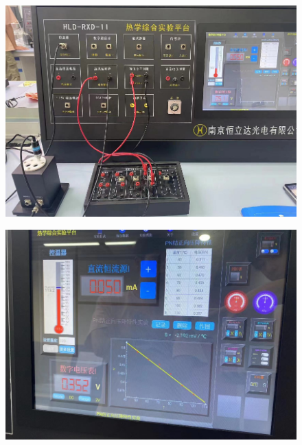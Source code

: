 \documentclass[UTF8]{article}
\begin{document}
    	\begin{figure}[H]
    	   \begin{minipage}[t]{0.5\linewidth}
    	      \centering
    	      \includegraphics[clip,scale=0.5,trim={0 0 0 0}]{fig/fig7.png}
    	      \label{figure.9}
    	   \end{minipage}
    	   \begin{minipage}[t]{0.5\linewidth}
    	      \centering
    	      \includegraphics[clip,scale=0.5,trim={0 0 0 0}]{fig/fig8.png}
    	      \label{figure.10}
    	   \end{minipage}
    	\end{figure} 
    
\end{document}
